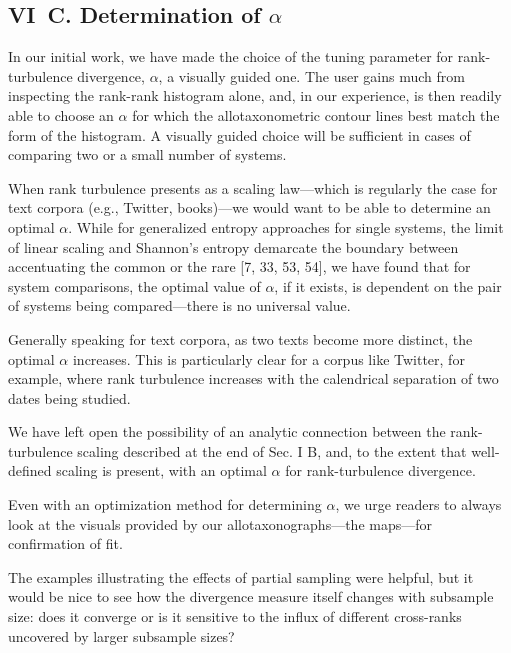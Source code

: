 \begin{excerpt}
  \subsection*{VI~C. Determination of $\alpha$}
  In our initial work, we have made the choice of the tuning parameter for
  rank-turbulence divergence, $\alpha$, a visually guided one.
  The user gains much from inspecting the rank-rank histogram alone,
  and, in our experience, is then readily able to choose an $\alpha$ for
  which the allotaxonometric contour lines best match the form of the histogram.
  A visually guided choice will be sufficient in cases of comparing two or a small
  number of systems.

  When rank turbulence presents as a scaling law---which is regularly the case
  for text corpora (e.g., Twitter, books)---we would want to be able to determine an optimal $\alpha$.
  While for generalized entropy approaches for single systems, the limit of
  linear scaling and Shannon's entropy demarcate the boundary
  between accentuating the common or the rare [7, 33, 53, 54], 
  we have found that for system comparisons, the optimal value of $\alpha$, if it exists,
  is dependent on the pair of systems being compared---there is no universal value.

  Generally speaking for text corpora, as two texts become more distinct,
  the optimal $\alpha$ increases.
  This is particularly clear for a corpus like
  Twitter, for example, where rank turbulence increases with the
  calendrical separation of two dates being studied.

  We have left open the
  possibility of an analytic
  connection between the rank-turbulence scaling described
  at the end of Sec. I B,
  and, to the extent that well-defined scaling is present,
  with an optimal $\alpha$ for rank-turbulence divergence.

  Even with an optimization method for determining $\alpha$, we urge readers to
  always look at the visuals provided by our allotaxonographs---the maps---for confirmation of fit.
\end{excerpt}

\begin{reviewercomment}
  The examples illustrating the effects of partial sampling were
  helpful, but it would be nice to see how the divergence measure
  itself changes with subsample size: does it converge or is it
  sensitive to the influx of different cross-ranks uncovered by larger
  subsample sizes?
\end{reviewercomment}

